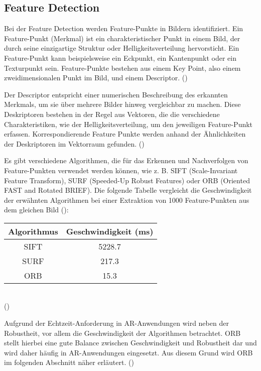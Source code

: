 \subsection{Feature Detection}

Bei der Feature Detection werden Feature-Punkte in Bildern identifiziert. Ein Feature-Punkt (Merkmal) ist ein charakteristischer Punkt in einem Bild, der durch seine einzigartige Struktur oder Helligkeitsverteilung hervorsticht. Ein Feature-Punkt kann beispielsweise ein Eckpunkt, ein Kantenpunkt oder ein Texturpunkt sein. Feature-Punkte bestehen aus einem Key Point, also einem zweidimensionalen Punkt im Bild, und einem Descriptor. (\cite{gao2021vSLAM, szeliski2022computerVision})

Der Descriptor entspricht einer numerischen Beschreibung des erkannten Merkmals, um sie über mehrere Bilder hinweg vergleichbar zu machen. Diese Deskriptoren bestehen in der Regel aus Vektoren, die die verschiedene Charakteristiken, wie der Helligkeitsverteilung, um den jeweiligen Feature-Punkt erfassen. Korrespondierende Feature Punkte werden anhand der Ähnlichkeiten der Deskriptoren im Vektorraum gefunden. (\cite{gao2021vSLAM, szeliski2022computerVision})

Es gibt verschiedene Algorithmen, die für das Erkennen und Nachverfolgen von Feature-Punkten verwendet werden können, wie z. B. SIFT (Scale-Invariant Feature Transform), SURF (Speeded-Up Robust Features) oder ORB (Oriented FAST and Rotated BRIEF). Die folgende Tabelle vergleicht die Geschwindigkeit der erwähnten Algorithmen bei einer Extraktion von 1000 Feature-Punkten aus dem gleichen Bild (\cite{gao2021vSLAM}):

\begin{center}
    \begin{tabular}{ |c|c| } 
        \hline
        Algorithmus & Geschwindigkeit (ms) \\
        \hline
        SIFT & 5228.7 \\
        SURF & 217.3 \\
        ORB & 15.3 \\
        \hline
    \end{tabular} \\
    (\cite{gao2021vSLAM})
\end{center}

Aufgrund der Echtzeit-Anforderung in AR-Anwendungen wird neben der Robustheit, vor allem die Geschwindigkeit der Algorithmen betrachtet. ORB stellt hierbei eine gute Balance zwischen Geschwindigkeit und Robustheit dar und wird daher häufig in AR-Anwendungen eingesetzt. Aus diesem Grund wird ORB im folgenden Abschnitt näher erläutert. (\cite{gao2021vSLAM, rublee2011orb})


